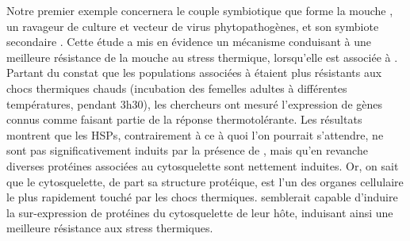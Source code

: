 Notre premier exemple concernera le couple symbiotique que forme la mouche , un ravageur de culture et vecteur de virus phytopathogènes, et son symbiote secondaire  \cite{brumin2011}.
Cette étude a mis en évidence un mécanisme conduisant à une meilleure résistance de la mouche au stress thermique, lorsqu'elle est associée à .
Partant du constat que les populations associées à  étaient plus résistants aux chocs thermiques chauds (incubation des femelles adultes à différentes températures, pendant 3h30), les chercheurs ont mesuré l'expression de gènes connus comme faisant partie de la réponse thermotolérante.
Les résultats montrent que les HSPs, contrairement à ce à quoi l'on pourrait s'attendre, ne sont pas significativement induits par la présence de , mais qu'en revanche diverses protéines associées au cytosquelette sont nettement induites.
Or, on sait que le cytosquelette, de part sa structure protéique, est l'un des organes cellulaire le plus rapidement touché par les chocs thermiques.
 semblerait capable d'induire la sur-expression de protéines du cytosquelette de leur hôte, induisant ainsi une meilleure résistance aux stress thermiques.

\cite{tang2012}
\cite{dunbar2007}
\cite{stoll2009}
\cite{harmon2009}
\cite{montllor2002}
\cite{bordenstein2011}
